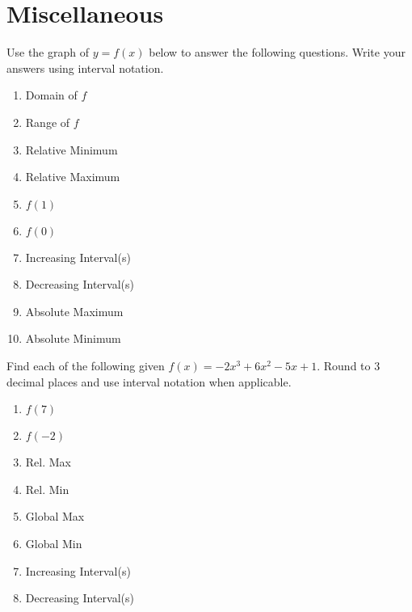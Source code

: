 \newpage

\section{Miscellaneous}

Use the graph of $y = f(x)$ below to answer the following questions. Write your answers using interval notation.
\begin{center}
\end{center}

\begin{multicols}{2}
\begin{enumerate}
\item Domain of $f$
\item Range of $f$
\item Relative Minimum
\item Relative Maximum
\item $f(1)$
\item $f(0)$
\item Increasing Interval(s)
\item Decreasing Interval(s)
\item Absolute Maximum
\item Absolute Minimum
\setcounter{Review}{\value{enumi}}
\end{enumerate}
\end{multicols}

Find each of the following given $f(x) = -2x^{3}+6x^{2}-5x+1$. Round to 3 decimal places and use interval notation when applicable.
\begin{multicols}{2}
\begin{enumerate}
\setcounter{enumi}{\value{Review}}
\item $f(7)$
\item $f(-2)$
\item Rel. Max
\item Rel. Min
\item Global Max
\item Global Min
\item Increasing Interval(s)
\item Decreasing Interval(s)
\setcounter{Review}{\value{enumi}}
\end{enumerate}
\end{multicols}

